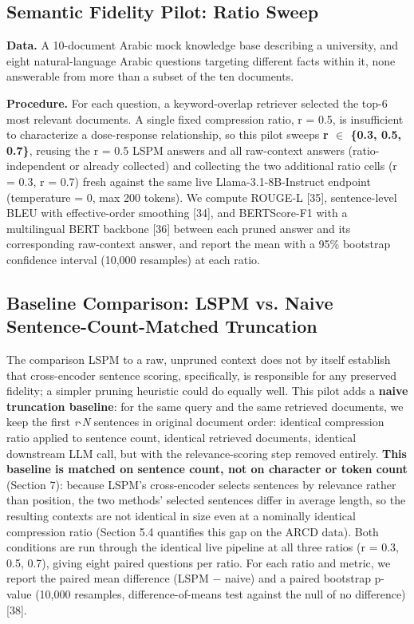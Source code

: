 \subsection{Semantic Fidelity Pilot: Ratio Sweep}
\textbf{Data.} A 10-document Arabic mock knowledge base describing a university, and eight natural-language Arabic questions targeting different facts within it, none answerable from more than a subset of the ten documents.

\textbf{Procedure.} For each question, a keyword-overlap retriever selected the top-6 most relevant documents. A single fixed compression ratio, r = 0.5, is insufficient to characterize a dose-response relationship, so this pilot sweeps \textbf{r $\in$ \{0.3, 0.5, 0.7\}}, reusing the r = 0.5 LSPM answers and all raw-context answers (ratio-independent or already collected) and collecting the two additional ratio cells (r = 0.3, r = 0.7) fresh against the same live Llama-3.1-8B-Instruct endpoint (temperature = 0, max 200 tokens). We compute ROUGE-L [35], sentence-level BLEU with effective-order smoothing [34], and BERTScore-F1 with a multilingual BERT backbone [36] between each pruned answer and its corresponding raw-context answer, and report the mean with a 95\% bootstrap confidence interval (10,000 resamples) at each ratio.

\subsection{Baseline Comparison: LSPM vs. Naive Sentence-Count-Matched Truncation}
The comparison LSPM to a raw, unpruned context does not by itself establish that cross-encoder sentence scoring, specifically, is responsible for any preserved fidelity; a simpler pruning heuristic could do equally well. This pilot adds a \textbf{naive truncation baseline}: for the same query and the same retrieved documents, we keep the first \textit{r}$\cdot$\textit{N} sentences in original document order: identical compression ratio applied to sentence count, identical retrieved documents, identical downstream LLM call, but with the relevance-scoring step removed entirely. \textbf{This baseline is matched on sentence count, not on character or token count} (Section 7): because LSPM's cross-encoder selects sentences by relevance rather than position, the two methods' selected sentences differ in average length, so the resulting contexts are not identical in size even at a nominally identical compression ratio (Section 5.4 quantifies this gap on the ARCD data). Both conditions are run through the identical live pipeline at all three ratios (r = 0.3, 0.5, 0.7), giving eight paired questions per ratio. For each ratio and metric, we report the paired mean difference (LSPM $-$ naive) and a paired bootstrap p-value (10,000 resamples, difference-of-means test against the null of no difference) [38].

